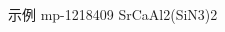 \documentclass{beamer}
\begin{document}
\begin{frame}{示例 mp-1218409 SrCaAl2(SiN3)2}
\begin{columns}[T]
\begin{column}{0.5\textwidth}
        \end{column}
    \end{columns}
\end{frame}
\end{document}
